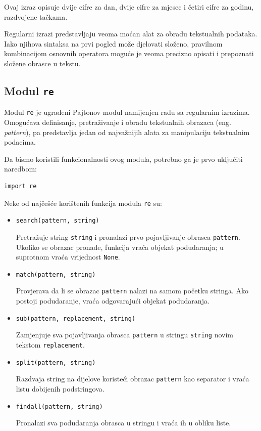 Ovaj izraz opisuje dvije cifre za dan, dvije cifre za mjesec i četiri cifre za godinu, razdvojene tačkama.

\bigskip

Regularni izrazi predstavljaju veoma moćan alat za obradu tekstualnih podataka. Iako njihova sintaksa na prvi pogled može djelovati složeno, pravilnom kombinacijom osnovnih operatora moguće je veoma precizno opisati i prepoznati složene obrasce u tekstu.

\subsection{Modul \texttt{re}}

Modul \texttt{re} je ugrađeni Pajtonov modul namijenjen radu sa regularnim izrazima. Omogućava definisanje, pretraživanje i obradu tekstualnih obrazaca (eng. \textit{pattern}), pa predstavlja jedan od najvažnijih alata za manipulaciju tekstualnim podacima.

Da bismo koristili funkcionalnosti ovog modula, potrebno ga je prvo uključiti naredbom:

\begin{verbatim}
import re
\end{verbatim}

Neke od najčešće korištenih funkcija modula \texttt{re} su:

\begin{itemize}
	
	\item \texttt{search(pattern, string)}
	
	Pretražuje string \texttt{string} i pronalazi prvo pojavljivanje obrasca \texttt{pattern}. Ukoliko se obrazac pronađe, funkcija vraća objekat podudaranja; u suprotnom vraća vrijednost \texttt{None}.
	
	\item \texttt{match(pattern, string)}
	
	Provjerava da li se obrazac \texttt{pattern} nalazi na samom početku stringa. Ako postoji podudaranje, vraća odgovarajući objekat podudaranja.
	
	\item \texttt{sub(pattern, replacement, string)}
	
	Zamjenjuje sva pojavljivanja obrasca \texttt{pattern} u stringu \texttt{string} novim tekstom \texttt{replacement}.
	
	\item \texttt{split(pattern, string)}
	
	Razdvaja string na dijelove koristeći obrazac \texttt{pattern} kao separator i vraća listu dobijenih podstringova.
	
	\item \texttt{findall(pattern, string)}
	
	Pronalazi sva podudaranja obrasca u stringu i vraća ih u obliku liste.
	
\end{itemize}

